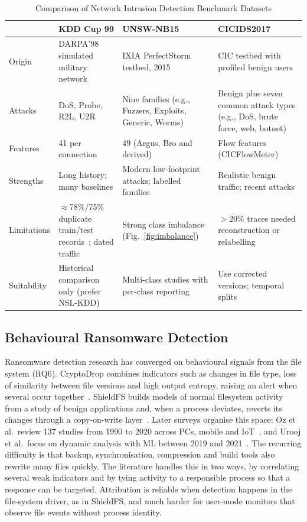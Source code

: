 \documentclass[conference]{IEEEtran}
\begin{document}
\begin{table}[t]
\caption{Comparison of Network Intrusion Detection Benchmark Datasets}
\label{tab:datasets}
\centering
\footnotesize
\setlength{\tabcolsep}{2.5pt}
\begin{tabularx}{\columnwidth}{@{}p{1.25cm}YYY@{}}
\toprule
 & \textbf{KDD Cup 99} & \textbf{UNSW-NB15} & \textbf{CICIDS2017} \\
\midrule
Origin & DARPA'98 simulated military network~\cite{tavallaee2009detailed} & IXIA PerfectStorm testbed, 2015~\cite{moustafa2015unsw} & CIC testbed with profiled benign users~\cite{sharafaldin2018toward} \\
Attacks & DoS, Probe, R2L, U2R & Nine families (e.g., Fuzzers, Exploits, Generic, Worms) & Benign plus seven common attack types (e.g., DoS, brute force, web, botnet) \\
Features & 41 per connection & 49 (Argus, Bro and derived) & Flow features (CICFlowMeter) \\
Strengths & Long history; many baselines & Modern low-footprint attacks; labelled families & Realistic benign traffic; recent attacks \\
Limitations & $\approx$78\%/75\% duplicate train/test records~\cite{tavallaee2009detailed}; dated traffic & Strong class imbalance (Fig.~\ref{fig:imbalance}) & $>$20\% traces needed reconstruction or relabelling~\cite{engelen2021troubleshooting} \\
Suitability & Historical comparison only (prefer NSL-KDD) & Multi-class studies with per-class reporting & Use corrected versions; temporal splits \\
\bottomrule
\end{tabularx}
\end{table}

\subsection{Behavioural Ransomware Detection}
Ransomware detection research has converged on behavioural signals from the file system (RQ6). CryptoDrop combines indicators such as changes in file type, loss of similarity between file versions and high output entropy, raising an alert when several occur together~\cite{scaife2016cryptolock}. ShieldFS builds models of normal filesystem activity from a study of benign applications and, when a process deviates, reverts its changes through a copy-on-write layer~\cite{continella2016shieldfs}. Later surveys organise this space: Oz et al.\ review 137 studies from 1990 to 2020 across PCs, mobile and IoT~\cite{oz2022survey}, and Urooj et al.\ focus on dynamic analysis with ML between 2019 and 2021~\cite{urooj2022ransomware}. The recurring difficulty is that backup, synchronisation, compression and build tools also rewrite many files quickly. The literature handles this in two ways, by correlating several weak indicators and by tying activity to a responsible process so that a response can be targeted. Attribution is reliable when detection happens in the file-system driver, as in ShieldFS, and much harder for user-mode monitors that observe file events without process identity.
\end{document}
